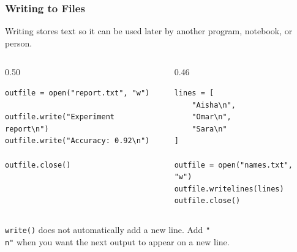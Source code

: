 \documentclass[aspectratio=169,10pt]{beamer}
\newcommand{\codeword}[1]{\texttt{#1}}
\begin{document}
\begin{frame}[fragile]
\frametitle{Writing to Files}
\small
Writing stores text so it can be used later by another program, notebook, or person.

\vspace{0.15cm}
\begin{columns}[T,totalwidth=0.96\textwidth]
\begin{column}{0.50\textwidth}
\begin{lstlisting}[style=pycode]
outfile = open("report.txt", "w")

outfile.write("Experiment report\n")
outfile.write("Accuracy: 0.92\n")

outfile.close()
\end{lstlisting}
\end{column}
\begin{column}{0.46\textwidth}
\begin{lstlisting}[style=pycode]
lines = [
    "Aisha\n",
    "Omar\n",
    "Sara\n"
]

outfile = open("names.txt", "w")
outfile.writelines(lines)
outfile.close()
\end{lstlisting}
\end{column}
\end{columns}

\vspace{0.2cm}
\begin{tcolorbox}[lecturebox,title=Checkpoint]
\codeword{write()} does not automatically add a new line. Add \codeword{"\\n"} when you want the next output to appear on a new line.
\end{tcolorbox}
\end{frame}
\end{document}

